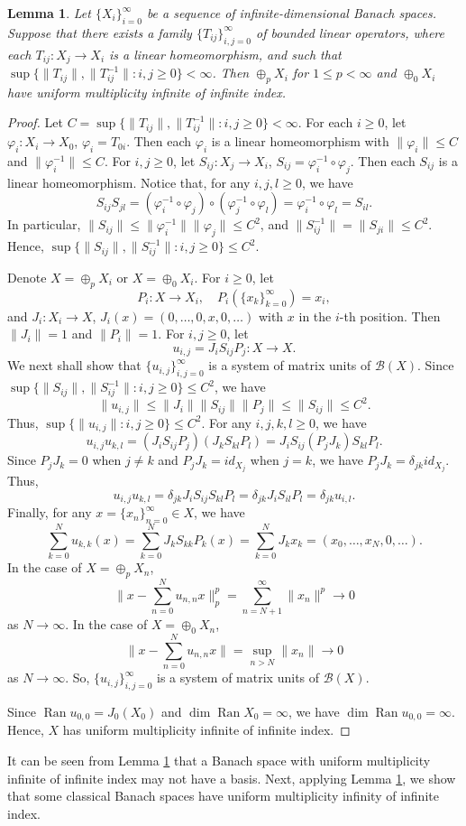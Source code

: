 \documentclass[12pt]{amsart}
\numberwithin{equation}{section}
\theoremstyle{plain}
\newtheorem{lem}[thm]{Lemma}
\theoremstyle{definition}
\newcommand{\B}{{\mathcal{B}}}
\renewcommand{\phi}{\varphi}
\newcommand{\ran}{\operatorname{Ran}}
\begin{document}
\begin{lem}\label{L:direct}
Let $\{X_i\}_{i=0}^{\infty}$ be a sequence of infinite-dimensional Banach spaces.
Suppose that there exists a family $\{T_{ij}\}_{i,j=0}^{\infty}$ of bounded linear operators, where each $T_{ij}:X_j\rightarrow X_i$
is a linear homeomorphism, and such that
$\sup\{\|T_{ij}\|,\|T_{ij}^{-1}\|:i,j\geq 0\}<\infty$.
Then $\oplus_p X_i$ for $1\leq p<\infty$ and $\oplus_0 X_i$ have uniform multiplicity infinite of infinite index.
\end{lem}
\begin{proof}
Let $C=\sup\{\|T_{ij}\|,\|T_{ij}^{-1}\|:i,j\geq 0\}<\infty$.
For each $i\geq 0$, let $\phi_i:X_i\rightarrow X_0$, $\phi_i=T_{0i}$.
Then each $\phi_{i}$ is a linear
homeomorphism with $\|\phi_{i}\|\leq C$ and $\|\phi^{-1}_{i}\|\leq C$.
For $i,j\geq 0$,
let $S_{ij}:X_j\rightarrow X_i$,
$S_{ij}=\phi^{-1}_{i}\circ\phi_j$.
Then each $S_{ij}$ is a linear
homeomorphism.
Notice that, for any $i,j,l\geq 0$, we have
$$S_{ij}S_{jl}=(\phi_{i}^{-1}\circ \phi_{j})\circ (\phi_{j}^{-1}\circ \phi_l)=\phi_{i}^{-1}\circ\phi_{l}=S_{il}.$$
In particular,
$\|S_{ij}\|\leq\|\phi_{i}^{-1}\|\|\phi_j\|\leq C^2$,
and $\|S_{ij}^{-1}\|=\|S_{ji}\|\leq C^2$.
Hence, $\sup\{\|S_{ij}\|,\|S_{ij}^{-1}\|:i,j\geq 0\}\leq C^2$.

Denote $X=\oplus_p X_i$ or $X=\oplus_0 X_i$.
For $i\geq 0$, let
$$P_i:X\rightarrow X_i,\quad P_i(\{x_k\}_{k=0}^{\infty})=x_i,$$
and $J_i:X_i\rightarrow X$, $J_i(x)=(0,\ldots,0,x,0,\ldots)$ with $x$ in the $i$-th position.
Then $\|J_i\|= 1$ and $\|P_i\|= 1$.
For $i,j\geq 0$,
let
$$u_{i,j}=J_{i}S_{ij}P_j: X\rightarrow X.$$
We next shall show that $\{u_{i,j}\}_{i,j=0}^{\infty}$ is a system of matrix units of $\B(X)$.
Since $\sup\{\|S_{ij}\|,\|S_{ij}^{-1}\|:i,j\geq 0\}\leq C^2$, we have
$$\|u_{i,j}\|\leq \|J_i\|\|S_{ij}\|\|P_j\|\leq \|S_{ij}\|\leq C^2.$$
Thus, $\sup\{\|u_{i,j}\|:i,j\geq 0\}\leq C^2$.
For any $i,j,k,l\geq 0$, we have
$$u_{i,j}u_{k,l}=(J_i S_{ij} P_j)(J_k S_{kl}P_l)=J_i S_{ij}(P_jJ_k)S_{kl}P_l.$$
Since $P_j J_k=0$ when $j\neq k$ and $P_j J_k=id_{X_j}$ when $j=k$, we have $P_j J_k=\delta_{jk}id_{X_j}$.
Thus,
$$u_{i,j}u_{k,l}=\delta_{jk}J_iS_{ij}S_{kl}P_l=\delta_{jk}J_iS_{il}P_l=\delta_{jk}u_{i,l}.$$
Finally, for any $x=\{x_n\}_{n=0}^{\infty}\in X$, we have
$$\sum_{k=0}^{N}u_{k,k}(x)=\sum_{k=0}^{N}J_kS_{kk}P_k(x)=\sum_{k=0}^{N}J_k x_k=(x_0,\ldots,x_N,0,\ldots).$$
In the case of $X=\oplus_p X_n$,
$$\|x-\sum_{n=0}^{N}u_{n,n}x\|_p^p=\sum_{n=N+1}^{\infty}\|x_n\|^p\rightarrow 0$$
as $N\rightarrow \infty$.
In the case of $X=\oplus_0 X_n$,
$$\|x-\sum_{n=0}^{N}u_{n,n}x\|=\sup_{n>N}\|x_n\|\rightarrow 0$$
as $N\rightarrow \infty$.
So, $\{u_{i,j}\}_{i,j=0}^{\infty}$ is a system of matrix units of $\B(X)$.

Since $\ran u_{0,0}=J_0 (X_0)$ and
$\dim\ran X_0=\infty$, we have $\dim\ran u_{0,0}=\infty$.
Hence, $X$ has uniform multiplicity infinite of infinite index.
\end{proof}
It can be seen from Lemma \ref{L:direct} that a Banach space with uniform multiplicity infinite of infinite index may not have a basis.
Next, applying Lemma \ref{L:direct}, we show that some classical Banach spaces have uniform multiplicity infinity of infinite index.
\end{document}

